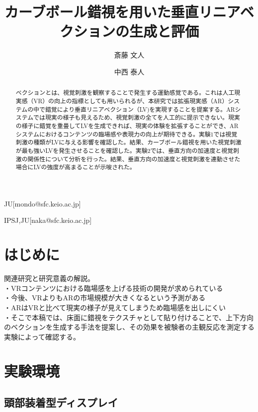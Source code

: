 \documentclass[submit,techrep]{ipsj}
\begin{document}
\title{カーブボール錯視を用いた垂直リニアベクションの生成と評価}



\author{斎藤 文人}{}{JU}[mondo@sfc.keio.ac.jp]
\author{中西 泰人}{}{IPSJ,JU}[naka@sfc.keio.ac.jp]

\begin{abstract}
ベクションとは、視覚刺激を観察することで発生する運動感覚である。これは人工現実感（VR）の向上の指標としても用いられるが、本研究では拡張現実感（AR）システムの中で錯覚により垂直リニアベクション（LV)を実現することを提案する。ARシステムでは現実の様子も見えるため、視覚刺激の全てを人工的に提示できない。現実の様子に錯覚を重畳してLVを生成できれば、現実の体験を拡張することができ、ARシステムにおけるコンテンツの臨場感や表現力の向上が期待できる。実験1では視覚刺激の種類がLVに与える影響を確認した。結果、カーブボール錯視を用いた視覚刺激が最も強いLVを発生させることを確認した。実験2では、垂直方向の加速度と視覚刺激の関係性について分析を行った。結果、垂直方向の加速度と視覚刺激を連動させた場合にLVの強度が高まることが示唆された。

\end{abstract}

\maketitle

\section{はじめに}

関連研究と研究意義の解説。\\
・VRコンテンツにおける臨場感を上げる技術の開発が求められている\\
・今後、VRよりもARの市場規模が大きくなるという予測がある\\
・ARはVRと比べて現実の様子が見えてしまうため臨場感を出しにくい\\
・そこで本稿では、床面に錯視をテクスチャとして貼り付けることで、上下方向のベクションを生成する手法を提案し、その効果を被験者の主観反応を測定する実験によって確認する。\\

\section{実験環境}

\subsection{頭部装着型ディスプレイ}
\end{document}
